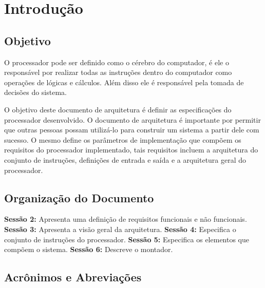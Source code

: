 \documentclass{report}
\begin{document}
\section{Introdução}
\subsection{Objetivo} 
O processador pode ser definido como o cérebro do computador, é ele o responsável por realizar todas as instruções dentro do computador como operações de lógicas e cálculos. Além disso ele é responsável pela tomada de decisões do sistema.

O objetivo deste documento de arquitetura é definir as especificações do processador desenvolvido. O documento de arquitetura é importante por permitir que outras pessoas possam utilizá-lo para construir um sistema a partir dele com sucesso. O mesmo  define os parâmetros de implementação que compõem os requisitos do processador implementado, tais requisitos incluem a arquitetura do conjunto de instruções, definições de entrada e saída e a arquitetura geral do processador. 

\subsection{Organização do Documento} 
\textbf{Sessão 2:} Apresenta uma definição de requisitos funcionais e não funcionais. \newline
\textbf{Sessão 3:} Apresenta a visão geral da arquitetura. \newline
\textbf{Sessão 4:} Especifica o conjunto de instruções do processador. \newline
\textbf{Sessão 5:} Especifica os elementos que compõem o sistema.\newline
\textbf{Sessão 6:} Descreve o montador. \newline

\subsection{Acrônimos e Abreviações}
\end{document}
